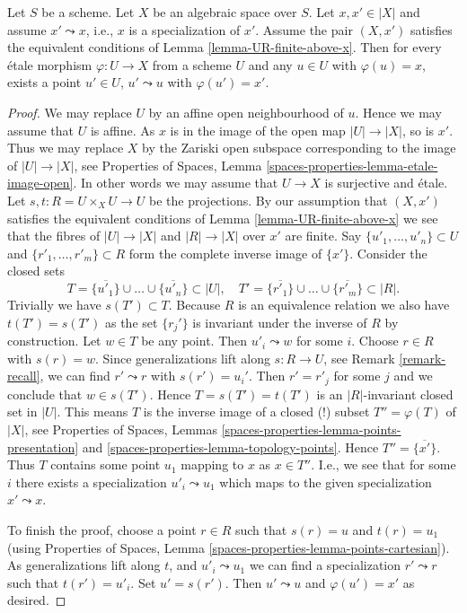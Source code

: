 \begin{lemma}
\label{lemma-specialization}
Let $S$ be a scheme.
Let $X$ be an algebraic space over $S$.
Let $x, x' \in |X|$ and assume $x' \leadsto x$, i.e., $x$ is a
specialization of $x'$.
Assume the pair $(X, x')$ satisfies the equivalent conditions
of Lemma \ref{lemma-UR-finite-above-x}.
Then for every \'etale morphism $\varphi : U \to X$ from a scheme $U$ and any
$u \in U$ with $\varphi(u) = x$, exists a point $u'\in U$,
$u' \leadsto u$ with $\varphi(u') = x'$.
\end{lemma}

\begin{proof}
We may replace $U$ by an affine open neighbourhood of $u$.
Hence we may assume that $U$ is affine. As $x$ is in the
image of the open map $|U| \to |X|$, so is $x'$. Thus we may
replace $X$ by the Zariski open subspace corresponding to
the image of $|U| \to |X|$, see
Properties of Spaces,
Lemma \ref{spaces-properties-lemma-etale-image-open}.
In other words we may assume that
$U \to X$ is surjective and \'etale.
Let $s, t : R = U \times_X U \to U$ be the projections.
By our assumption that $(X, x')$ satisfies the equivalent conditions of
Lemma \ref{lemma-UR-finite-above-x}
we see that the fibres of $|U| \to |X|$ and $|R| \to |X|$
over $x'$ are finite. Say $\{u'_1, \ldots, u'_n\} \subset U$ and
$\{r'_1, \ldots, r'_m\} \subset R$ form the complete inverse image
of $\{x'\}$.
Consider the closed sets
$$
T = \overline{\{u'_1\}} \cup \ldots \cup \overline{\{u'_n\}} \subset |U|,
\quad
T' = \overline{\{r'_1\}} \cup \ldots \cup \overline{\{r'_m\}} \subset |R|.
$$
Trivially we have $s(T') \subset T$. Because $R$ is an equivalence
relation we also have $t(T') = s(T')$ as the set $\{r_j'\}$
is invariant under the inverse of $R$ by construction. Let $w \in T$
be any point. Then $u'_i \leadsto w$ for some $i$. Choose $r \in R$
with $s(r) = w$. Since generalizations lift along $s : R \to U$, see
Remark \ref{remark-recall}, we can find $r' \leadsto r$ with
$s(r') = u_i'$. Then $r' = r'_j$ for some $j$ and we conclude that
$w \in s(T')$. Hence $T = s(T') = t(T')$ is an $|R|$-invariant closed
set in $|U|$. This means $T$ is the inverse image of a closed (!)
subset $T'' = \varphi(T)$ of $|X|$, see
Properties of Spaces,
Lemmas \ref{spaces-properties-lemma-points-presentation} and
\ref{spaces-properties-lemma-topology-points}.
Hence $T'' = \overline{\{x'\}}$.
Thus $T$ contains some point $u_1$ mapping to $x$ as $x \in T''$.
I.e., we see that for some $i$ there exists a specialization
$u'_i \leadsto u_1$ which maps to the given specialization
$x' \leadsto x$.

\medskip\noindent
To finish the proof, choose a point $r \in R$ such that
$s(r) = u$ and $t(r) = u_1$ (using
Properties of Spaces,
Lemma \ref{spaces-properties-lemma-points-cartesian}).
As generalizations lift along $t$, and $u'_i \leadsto u_1$
we can find a specialization $r' \leadsto r$ such that $t(r') = u'_i$.
Set $u' = s(r')$. Then $u' \leadsto u$ and $\varphi(u') = x'$ as
desired.
\end{proof}

